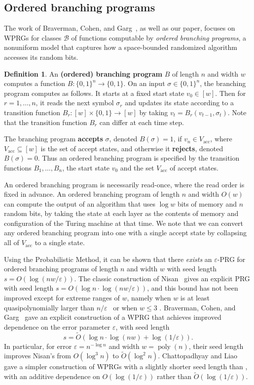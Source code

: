 \documentclass[11pt]{article}
\numberwithin{equation}{section}
\theoremstyle{definition}
\newtheorem{definition}[theorem]{Definition}
\theoremstyle{plain}
\newcommand{\tO}{\widetilde{O}}
\newcommand{\eps}{\varepsilon}
\newcommand{\zo}{\{0,1\}}
\newcommand{\ra}{\rightarrow}
\newcommand{\cB}{\mathcal{B}}
\newcommand{\acc}{V_{\text{acc}}}
\newcommand{\poly}{\operatorname{poly}}
\begin{document}
\subsection{Ordered branching programs}

    The work of Braverman, Cohen, and Garg~\cite{BravermanCoGa18}, as well as our paper, focuses
    on WPRGs for classes $\cB$ of functions computable by \emph{ordered branching programs}, a nonuniform model that captures how a space-bounded randomized algorithm accesses its random bits.
	
	\begin{definition} \label{def:obp}
	An \textbf{(ordered) branching program} $B$ of length $n$ and width $w$ computes a function $B:\zo^n \ra \{0,1\}$. On an input $\sigma\in\{0,1\}^n$, the branching program computes as follows. It starts at a fixed start state $v_0\in [w]$. Then for $r=1,\ldots,n$, it reads the next symbol $\sigma_r$ and updates its state according to a transition function $B_r:[w]\times \zo\ra[w]$ by taking $v_{t}=B_r(v_{t-1},\sigma_t)$. Note that the transition function $B_r$ can differ at each time step. 
	
	The branching program \textbf{accepts} $\sigma$, denoted $B(\sigma)=1$, if $v_{n}\in \acc$, where $\acc \subseteq [w]$ is the set of accept states, and otherwise it \textbf{rejects}, denoted $B(\sigma)=0$.
	Thus an ordered branching program is specified by the transition functions $B_1,\ldots,B_n$, the start state $v_0$ and the set $\acc$ of accept states.
	\end{definition}
	An ordered branching program is necessarily read-once, where the read order is fixed in advance.
	An ordered branching program of length $n$ and width $O(w)$ can compute the output of an algorithm that uses $\log w$ bits of memory and $n$ random bits, by taking the state at each layer as the contents of memory and configuration of the Turing machine at that time.  We note that we can convert any ordered branching program into one with a single accept state by collapsing all of $\acc$ to a single state.
	
	Using the Probabilistic Method, it can be shown that there \emph{exists} an $\eps$-PRG for ordered branching programs of length $n$ and width $w$ with seed length
	$s=O(\log(nw/\eps))$.  The classic construction of Nisan~\cite{Nisan92} gives an explicit
	PRG with seed length $s = O(\log n \cdot \log(nw/\eps))$, and this bound has not been improved except for extreme ranges of $w$, namely when
	$w$ is at least quasipolynomially larger than $n/\eps$~\cite{NisanZu96,Armoni98,KaneNeWo08} or when $w\leq 3$ \cite{BogdanovDvVeYe09,SimaZa11,GopalanMeReTrVa12,MekaReTa18}.
	Braverman, Cohen, and Garg~\cite{BravermanCoGa18} gave an explicit construction of a WPRG that achieves improved dependence on the error parameter $\eps$, with seed length  $$s=\tO\left(\log n\cdot \log(nw) + \log(1/\eps)\right).$$
	In particular, for error $\eps=n^{-\log n}$ and width $w=\poly(n)$, their seed length improves Nisan's from $O(\log^3 n)$ to $\tO(\log^2 n)$.  
	Chattopadhyay %
    and Liao~\cite{ChattopadhyayLi20} gave a simpler construction of WPRGs with a slightly shorter seed length than \cite{BravermanCoGa18}, with an additive dependence on $O(\log(1/\eps))$ rather than $\tO(\log(1/\eps))$.
\end{document}
